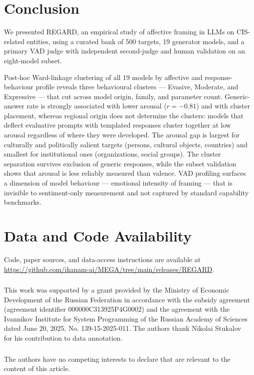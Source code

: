 \documentclass[runningheads,a4paper]{llncs}
\begin{document}
\section{Conclusion}
\label{sec:conclusion}

We presented REGARD, an empirical study of affective framing in LLMs
on CIS-related entities, using a curated bank of 500 targets, 19 generator
models, and a primary VAD judge with independent second-judge and human
validation on an eight-model subset.

Post-hoc Ward-linkage clustering of all 19 models by affective and response-behaviour profile reveals
three behavioural clusters --- Evasive, Moderate, and Expressive ---
that cut across model origin, family, and parameter count.
Generic-answer rate is strongly associated with lower arousal ($r = -0.81$) and with cluster placement, whereas regional origin does not determine the clusters: models that deflect
evaluative prompts with templated responses cluster together at low arousal
regardless of where they were developed.
The arousal gap is largest for culturally and politically salient targets
(persons, cultural objects, countries) and smallest for institutional ones
(organizations, social groups).
The cluster separation survives exclusion of generic responses, while the
subset validation shows that arousal is less reliably measured than valence.
VAD profiling surfaces a dimension of model behaviour --- emotional
intensity of framing --- that is invisible to sentiment-only measurement
and not captured by standard capability benchmarks.

\section*{Data and Code Availability}
Code, paper sources, and data-access instructions are available at
\url{https://github.com/ikanam-ai/MEGA/tree/main/releases/REGARD}.

\FloatBarrier
\begin{credits}
\subsubsection{\ackname}
This work was supported by a grant provided by the Ministry of Economic
Development of the Russian Federation in accordance with the subsidy agreement
(agreement identifier 000000C313925P4G0002) and the agreement with the Ivannikov
Institute for System Programming of the Russian Academy of Sciences dated
June 20, 2025, No. 139-15-2025-011. The authors thank Nikolai Stukalov for his
contribution to data annotation.

\subsubsection{\discintname}
The authors have no competing interests to declare that are relevant to the
content of this article.
\end{credits}



\end{document}
